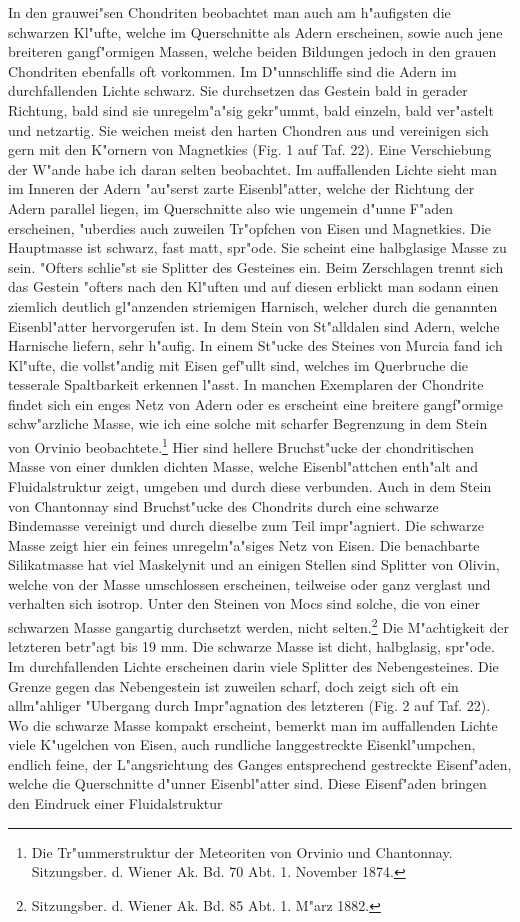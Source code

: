 \documentclass[a4paper, 11pt, oneside, polutonikogreek, german]{article}
\begin{document}
In den grauwei"sen Chondriten beobachtet man auch am h"aufigsten die schwarzen Kl"ufte, welche im Querschnitte als Adern erscheinen, sowie auch jene breiteren gangf"ormigen Massen, welche beiden Bildungen jedoch in den grauen Chondriten ebenfalls oft vorkommen. Im D"unnschliffe sind die Adern im durchfallenden Lichte schwarz. Sie durchsetzen das Gestein bald in gerader Richtung, bald sind sie unregelm"a"sig gekr"ummt, bald einzeln, bald ver"astelt und netzartig. Sie weichen meist den harten Chondren aus und vereinigen sich gern mit den K"ornern von Magnetkies (Fig. 1 auf Taf. 22). Eine Verschiebung der W"ande habe ich daran selten beobachtet. Im auffallenden Lichte sieht man im Inneren der Adern "au"serst zarte Eisenbl"atter, welche der Richtung der Adern parallel liegen, im Querschnitte also wie ungemein d"unne F"aden erscheinen, "uberdies auch zuweilen Tr"opfchen von Eisen und Magnetkies. Die Hauptmasse ist schwarz, fast matt, spr"ode. Sie scheint eine halbglasige Masse zu sein. "Ofters schlie"st sie Splitter des Gesteines ein. Beim Zerschlagen trennt sich das Gestein "ofters nach den Kl"uften und auf diesen erblickt man sodann einen ziemlich deutlich gl"anzenden striemigen Harnisch, welcher durch die genannten Eisenbl"atter hervorgerufen ist. In dem Stein von St"alldalen sind Adern, welche Harnische liefern, sehr h"aufig. In einem St"ucke des Steines von Murcia fand ich Kl"ufte, die vollst"andig mit Eisen gef"ullt sind, welches im Querbruche die tesserale Spaltbarkeit erkennen l"asst. In manchen Exemplaren der Chondrite findet sich ein enges Netz von Adern oder es erscheint eine breitere gangf"ormige schw"arzliche Masse, wie ich eine solche mit scharfer Begrenzung in dem Stein von Orvinio beobachtete.\footnote{Die Tr"ummerstruktur der Meteoriten von Orvinio und Chantonnay. Sitzungsber. d. Wiener Ak. Bd. 70 Abt. 1. November 1874.} Hier sind hellere Bruchst"ucke der chondritischen Masse von einer dunklen dichten Masse, welche Eisenbl"attchen enth"alt and Fluidalstruktur zeigt, umgeben und durch diese verbunden. Auch in dem Stein von Chantonnay sind Bruchst"ucke des Chondrits durch eine schwarze Bindemasse vereinigt und durch dieselbe zum Teil impr"agniert. Die schwarze Masse zeigt hier ein feines unregelm"a"siges Netz von Eisen. Die benachbarte Silikatmasse hat viel Maskelynit und an einigen Stellen sind Splitter von Olivin, welche von der Masse umschlossen erscheinen, teilweise oder ganz verglast und verhalten sich isotrop. Unter den Steinen von Mocs sind solche, die von einer schwarzen Masse gangartig durchsetzt werden, nicht selten.\footnote{Sitzungsber. d. Wiener Ak. Bd. 85 Abt. 1. M"arz 1882.} Die M"achtigkeit der letzteren betr"agt bis 19 mm. Die schwarze Masse ist dicht, halbglasig, spr"ode. Im durchfallenden Lichte erscheinen darin viele Splitter des Nebengesteines. Die Grenze gegen das Nebengestein ist zuweilen scharf, doch zeigt sich oft ein allm"ahliger "Ubergang durch Impr"agnation des letzteren (Fig. 2 auf Taf. 22). Wo die schwarze Masse kompakt erscheint, bemerkt man im auffallenden Lichte viele K"ugelchen von Eisen, auch rundliche langgestreckte Eisenkl"umpchen, endlich feine, der L"angsrichtung des Ganges entsprechend gestreckte Eisenf"aden, welche die Querschnitte d"unner Eisenbl"atter sind. Diese Eisenf"aden bringen den Eindruck einer Fluidalstruktur 
\end{document}
